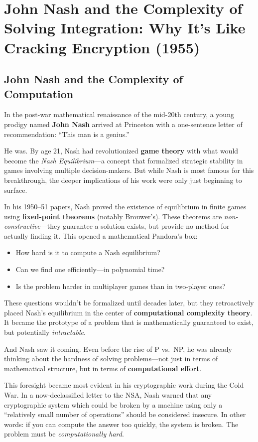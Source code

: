 \section{John Nash and the Complexity of Solving Integration: Why It's Like Cracking Encryption (1955)}

\subsection{John Nash and the Complexity of Computation}

In the post-war mathematical renaissance of the mid-20th century, a young prodigy named \textbf{John Nash} arrived at Princeton with a one-sentence letter of recommendation:  ``This man is a genius.''

He was. By age 21, Nash had revolutionized \textbf{game theory} with what would become the \textit{Nash Equilibrium}—a concept that formalized strategic stability in games involving multiple decision-makers. But while Nash is most famous for this breakthrough, the deeper implications of his work were only just beginning to surface.

In his 1950–51 papers, Nash proved the existence of equilibrium in finite games using \textbf{fixed-point theorems} (notably Brouwer’s). These theorems are \textit{non-constructive}—they guarantee a solution exists, but provide no method for actually finding it. This opened a mathematical Pandora’s box:

\begin{itemize}
    \item How hard is it to compute a Nash equilibrium?
    \item Can we find one efficiently—in polynomial time?
    \item Is the problem harder in multiplayer games than in two-player ones?
\end{itemize}

These questions wouldn’t be formalized until decades later, but they retroactively placed Nash’s equilibrium in the center of \textbf{computational complexity theory}. It became the prototype of a problem that is mathematically guaranteed to exist, but potentially \textit{intractable}. 

And Nash saw it coming. Even before the rise of P vs.\ NP, he was already thinking about the hardness of solving problems—not just in terms of mathematical structure, but in terms of \textbf{computational effort}.

This foresight became most evident in his cryptographic work during the Cold War. In a now-declassified letter to the NSA, Nash warned that any cryptographic system which could be broken by a machine using only a ``relatively small number of operations'' should be considered insecure. In other words: if you can compute the answer too quickly, the system is broken. The problem must be \textit{computationally hard}.

